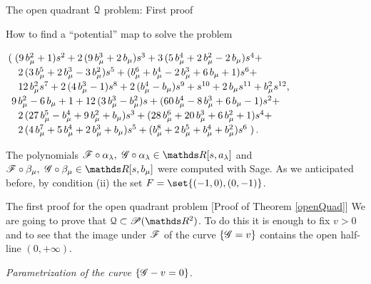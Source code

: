 \documentclass[11pt, a4paper, english, twoside, notitlepage, openright]{report}
\begin{document}
\begin{chapter}{The open quadrant $\mathcal{Q}$ problem: First proof}
\begin{section}{How to find a ``potential'' map to solve the problem}
\begin{enumerate}[(i)]
				$\arraycolsep=2pt\def\arraystretch{1.2}
\begin{array}{l}
\left(\right.{(9 \,b_{\mu}^{2}+1)}s^{2}+2 \,{(9 \,b_{\mu}^{3}+2\,b_{\mu})}s^{3}+3\,{(5\,b_{\mu}^{4}+2\,b_{\mu}^{2}-2\,b_{\mu})}s^{4}+\\
\quad 2\,{(3 \,b_{\mu}^{5}+2\,b_{\mu}^{3}-3\,b_{\mu}^{2})}s^{5}+{(b_{\mu}^{6}+b_{\mu}^{4}-2\,b_{\mu}^{3}+6\,b_{\mu}+1)} s^{6}+\\
\quad 12\,b_{\mu}^{2} s^{7}+2\,{(4\,b_{\mu}^{3}-1)}s^{8}+2\,{(b_{\mu}^{4}-b_{\mu})}s^{9}+s^{10}+2\,b_{\mu}s^{11}+b_{\mu}^{2} s^{12},\\
					\ 9 \, b_{\mu}^{2}-6 \, b_{\mu}+1+12 \, {(3 \, b_{\mu}^{3} - b_{\mu}^{2})} s+{(60\, b_{\mu}^{4} - 8 \, b_{\mu}^{3}+6 \, b_{\mu}-1)}s^{2} + \\
					\quad 2 \, {(27\,b_{\mu}^{5}-b_{\mu}^{4}+9\,b_{\mu}^{2}+b_{\mu})}s^{3}+{(28\,b_{\mu}^{6}+20\,b_{\mu}^{3}+6\,b_{\mu}^{2}+1)} s^{4}+\\
					\quad2\,{(4\,b_{\mu}^{7}+5\,b_{\mu}^{4}+2\,b_{\mu}^{3}+b_{\mu})}s^{5}+{(b_{\mu}^{8}+2\,b_{\mu}^{5}+ b_{\mu}^{4} +b_{\mu}^{2})} s^{6}\left.\right).
					\end{array}
$
\end{enumerate}
The polynomials $\F\circ\alpha_{\lambda },\ \G\circ\alpha_{\lambda}\in\R[s,a_{\lambda}]$ and $\F\circ\beta_{\mu},\ \G\circ\beta_{\mu}\in\R[s,b_{\mu}]$ were computed with Sage. As we anticipated before, by condition (ii) the set $F=\set{(-1, 0),(0,-1)}$.
\end{section}
\begin{section}{The first proof for the open quadrant problem} [Proof of Theorem \ref{openQuad}] We are going to prove that $\Qu\subset\P(\R^2)$. To do this it is enough to fix $v>0$ and to see that the image under $\mathscr{F}$ of the curve $\{\mathscr{G}=v\}$ contains the open half-line $(0,+\infty)$.
\begin{center}
 \emph{Parametrization of the curve $\{\mathscr{G}-v=0\}$.}
\end{center}\label{step1}


\end{section}
\end{chapter}
\end{document}

